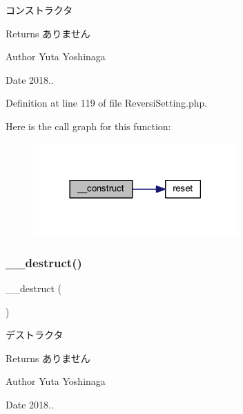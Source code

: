 コンストラクタ 

\begin{DoxyReturn}{Returns}
ありません 
\end{DoxyReturn}
\begin{DoxyAuthor}{Author}
Yuta Yoshinaga 
\end{DoxyAuthor}
\begin{DoxyDate}{Date}
2018.. 
\end{DoxyDate}


Definition at line 119 of file Reversi\+Setting.\+php.

Here is the call graph for this function\+:
\nopagebreak
\begin{figure}[H]
\begin{center}
\leavevmode
\includegraphics[width=222pt]{class_reversi_setting_a095c5d389db211932136b53f25f39685_cgraph}
\end{center}
\end{figure}
\mbox{\label{class_reversi_setting_a421831a265621325e1fdd19aace0c758}} 
\subsubsection{\texorpdfstring{\+\_\+\+\_\+destruct()}{\_\_destruct()}}
{\footnotesize\ttfamily \+\_\+\+\_\+destruct (\begin{DoxyParamCaption}{ }\end{DoxyParamCaption})}



デストラクタ 

\begin{DoxyReturn}{Returns}
ありません 
\end{DoxyReturn}
\begin{DoxyAuthor}{Author}
Yuta Yoshinaga 
\end{DoxyAuthor}
\begin{DoxyDate}{Date}
2018.. 
\end{DoxyDate}


